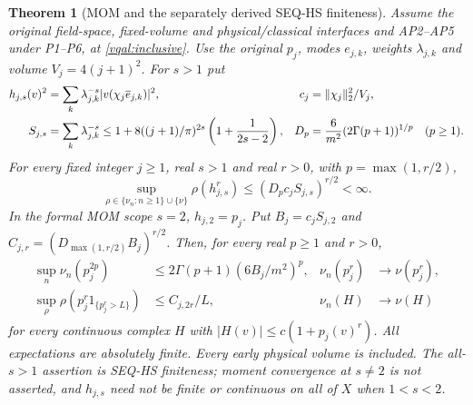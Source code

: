 \documentclass[11pt]{article}
\theoremstyle{plain}
\newtheorem{theorem}{Theorem}[section]
\theoremstyle{definition}
\theoremstyle{remark}
\begin{document}
\begin{theorem}[MOM and the separately derived SEQ-HS finiteness]
\label{vqal:mom}
Assume the original field-space, fixed-volume and physical/classical
interfaces and AP2--AP5 under P1--P6, at \eqref{vqal:inclusive}.
Use the original $p_j$, modes $e_{j,k}$, weights $\lambda_{j,k}$ and
volume $V_j=4(j+1)^2$. For $s>1$ put
\begin{align}\label{vqal:hsconstants}
 h_{j,s}(v)^2&=\sum_k\lambda_{j,k}^{-s}
                 |v(\chi_j\overline e_{j,k})|^2,&
 c_j&=\|\chi_j\|_2^2/V_j,\nonumber\\
 S_{j,s}&=\sum_k\lambda_{j,k}^{-s}
 \le1+8((j+1)/\pi)^{2s}\left(1+{1\over2s-2}\right),&
 D_p&={6\over m^2}(2\Gamma(p+1))^{1/p}\quad(p\ge1).
\end{align}
For every fixed integer $j\ge1$, real $s>1$ and real $r>0$, with $p=\max(1,r/2)$,
\begin{equation}\label{vqal:hsmom}
 \sup_{\rho\in\{\nu_n:n\ge1\}\cup\{\nu\}}
       \rho(h_{j,s}^{r})\le(D_pc_jS_{j,s})^{r/2}<\infty.
\end{equation}
In the formal MOM scope $s=2$, $h_{j,2}=p_j$. Put
$B_j=c_jS_{j,2}$ and $C_{j,r}=(D_{\max(1,r/2)}B_j)^{r/2}$.
Then, for every real $p\ge1$ and $r>0$,
\begin{align}\label{vqal:momconvergence}
 \sup_n\nu_n(p_j^{2p})&\le2\Gamma(p+1)(6B_j/m^2)^p,&
 \nu_n(p_j^r)&\longrightarrow\nu(p_j^r),\nonumber\\
 \sup_\rho\rho(p_j^r1_{\{p_j^r>L\}})&\le C_{j,2r}/L,&
 \nu_n(H)&\longrightarrow\nu(H)
\end{align}
for every continuous complex $H$ with $|H(v)|\le c(1+p_j(v)^r)$.
All expectations are absolutely finite. Every early physical volume is
included. The all-$s>1$ assertion is SEQ-HS finiteness; moment convergence
at $s\ne2$ is not asserted, and $h_{j,s}$ need not be finite or continuous
on all of $X$ when $1<s<2$.
\end{theorem}
\end{document}
